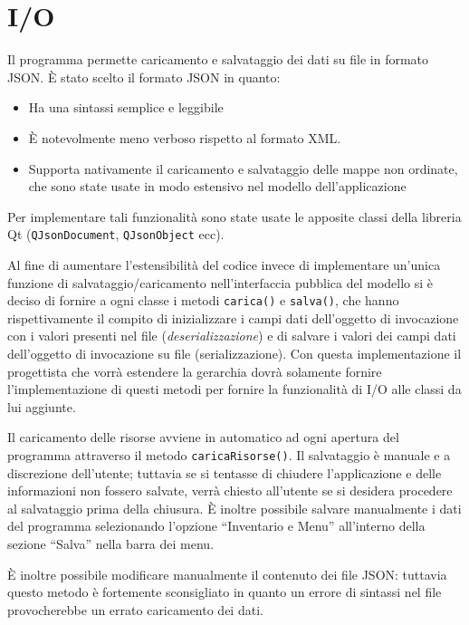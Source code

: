 \documentclass[
  10pt,
]{article}
\providecommand{\tightlist}{%
  \setlength{\itemsep}{0pt}\setlength{\parskip}{0pt}}
\begin{document}
\hypertarget{io}{%
\section{I/O}\label{io}}

Il programma permette caricamento e salvataggio dei dati su file in
formato JSON. È stato scelto il formato JSON in quanto:

\begin{itemize}
\tightlist
\item
  Ha una sintassi semplice e leggibile
\item
  È notevolmente meno verboso rispetto al formato XML.
\item
  Supporta nativamente il caricamento e salvataggio delle mappe non
  ordinate, che sono state usate in modo estensivo nel modello
  dell'applicazione
\end{itemize}

Per implementare tali funzionalità sono state usate le apposite classi
della libreria Qt (\texttt{QJsonDocument}, \texttt{QJsonObject} ecc).

Al fine di aumentare l'estensibilità del codice invece di implementare
un'unica funzione di salvataggio/caricamento nell'interfaccia pubblica
del modello si è deciso di fornire a ogni classe i metodi
\texttt{carica()} e \texttt{salva()}, che hanno rispettivamente il
compito di inizializzare i campi dati dell'oggetto di invocazione con i
valori presenti nel file (\emph{deserializzazione}) e di salvare i
valori dei campi dati dell'oggetto di invocazione su file
(serializzazione). Con questa implementazione il progettista che vorrà
estendere la gerarchia dovrà solamente fornire l'implementazione di
questi metodi per fornire la funzionalità di I/O alle classi da lui
aggiunte.

Il caricamento delle risorse avviene in automatico ad ogni apertura del
programma attraverso il metodo \texttt{caricaRisorse()}. Il salvataggio
è manuale e a discrezione dell'utente; tuttavia se si tentasse di
chiudere l'applicazione e delle informazioni non fossero salvate, verrà
chiesto all'utente se si desidera procedere al salvataggio prima della
chiusura. È inoltre possibile salvare manualmente i dati del programma
selezionando l'opzione ``Inventario e Menu'' all'interno della sezione
``Salva'' nella barra dei menu.

È inoltre possibile modificare manualmente il contenuto dei file JSON:
tuttavia questo metodo è fortemente sconsigliato in quanto un errore di
sintassi nel file provocherebbe un errato caricamento dei dati.
\end{document}
